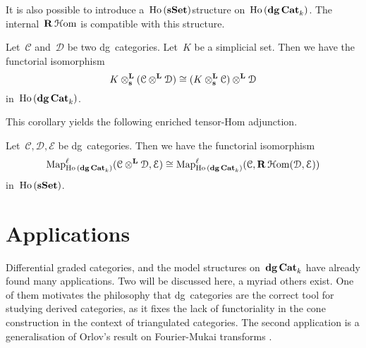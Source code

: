 It is also possible to introduce a~$\operatorname{\mathrm{Ho} \,}(\mathbf{s\,\!\mathbf{Set}})$\dash structure on~$\operatorname{\mathrm{Ho} \,}(\mathbf{dg\,Cat}_k)$. The internal~$\mathbf{R}\operatorname{\mathcal{H}om}$ is compatible with this structure.
\begin{corollary}
  \label{corollary:simplicial-compatibility}
  Let~$\mathcal{C}$ and~$\mathcal{D}$ be two dg~categories. Let~$K$ be a simplicial set. Then we have the functorial isomorphism
  \begin{equation}
    K\otimes^{\mathbf{L}}_{\mathbf{s}}(\mathcal{C}\otimes^{\mathbf{L}}\mathcal{D})\cong(K\otimes^{\mathbf{L}}_{\mathbf{s}}\mathcal{C})\otimes^{\mathbf{L}}\mathcal{D}
  \end{equation}
  in~$\operatorname{\mathrm{Ho} \,}(\mathbf{dg\,Cat}_k)$.
\end{corollary}
This corollary yields the following enriched tensor-Hom adjunction.
\begin{corollary}
  \label{corollary:internal-Hom-Map-adjointness}
  Let~$\mathcal{C},\mathcal{D},\mathcal{E}$ be dg~categories. Then we have the functorial isomorphism
  \begin{equation}
    \label{equation:internal-Hom-Map-adjointness}
    \operatorname{\mathrm{Map}}_{\operatorname{\mathrm{Ho} \,}(\mathbf{dg\,Cat}_k)}^\ell(\mathcal{C}\otimes^{\mathbf{L}}\mathcal{D},\mathcal{E})\cong\operatorname{\mathrm{Map}}_{\operatorname{\mathrm{Ho} \,}(\mathbf{dg\,Cat}_k)}^\ell(\mathcal{C},\mathbf{R}\operatorname{\mathcal{H}om}(\mathcal{D},\mathcal{E}))
  \end{equation}
  in~$\operatorname{\mathrm{Ho} \,}(\mathbf{s\,\!\mathbf{Set}})$.
\end{corollary}


\section{Applications}
Differential graded categories, and the model structures on~$\mathbf{dg\,Cat}_k$ have already found many applications. Two will be discussed here, a myriad others exist. One of them motivates the philosophy that dg~categories are the correct tool for studying derived categories, as it fixes the lack of functoriality in the cone construction in the context of triangulated categories. The second application is a generalisation of Orlov's result on Fourier-Mukai transforms \cite{orlov}.

